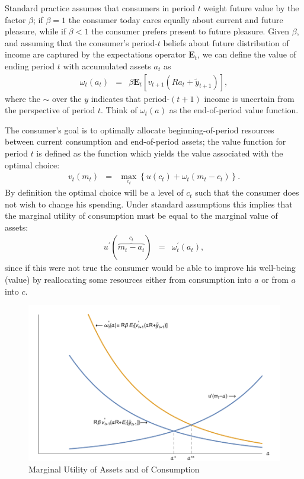 Standard practice assumes that consumers in period $t$ weight future
value by the factor $\beta$; if $\beta=1$ the consumer today cares
equally about current and future pleasure, while if $\beta<1$ the
consumer prefers present to future pleasure.  Given $\beta$, and
assuming that the consumer's period-$t$ beliefs about future
distribution of income are captured by the expectations operator
$\mathbf{E}_{t}$, we can define the value of ending period $t$ with accumulated
assets ${a}_{t}$ as
\begin{eqnarray}
  \omega_{t}({a}_{t}) & = & \beta \mathbf{E}_{t}[{v}_{t+1}(R {a}_{t}+\tilde{y}_{t+1})],
\end{eqnarray}
where the $\sim$ over the $y$ indicates that period-$(t+1)$ income
is uncertain from the perspective of period $t$.  Think of $\omega_{t}(a)$ as
the end-of-period value function.

The consumer's goal is to optimally allocate beginning-of-period resources
between current consumption and end-of-period assets; the value function
for period $t$ is defined as the function which yields the value associated
with the optimal choice:
\begin{eqnarray}
  v_{t}(m_{t}) & = & \max_{{c}_{t}} \left\{u({c}_{t}) + \omega_{t}({m}_{t}-{c}_{t})\right\}.
\end{eqnarray}
By definition the optimal choice will be a level of ${c}_{t}$ such that the consumer does not wish to change
his spending. Under standard assumptions this implies that the marginal utility of consumption must be equal to the
marginal value of assets:
\begin{eqnarray}
  u^{\prime}(\overbrace{{m}_{t}-{a}_{t}}^{{c}_{t}}) & = & \omega_{t}^{\prime}({a}_{t}) \label{eq:FOC}
,
\end{eqnarray}
since if this were not true the consumer would be able to improve
his well-being (value) by reallocating some resources either from consumption
into $a$ or from $a$ into $c$.

\begin{figure}
\caption{Marginal Utility of Assets and of Consumption} \label{fig:EquateMargUtils}
\includegraphics[width=5.5in]{./Figures/EquateMargUtils}
\end{figure}


